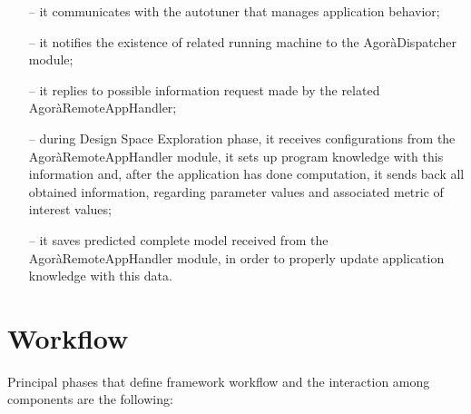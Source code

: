 \begin{enumerate}
\begin{itemize}
		\item [--] it communicates with the autotuner that manages application behavior;

		\item [--] it notifies the existence of related running machine to the AgoràDispatcher module;

		\item [--] it replies to possible information request made by the related AgoràRemoteAppHandler;

		\item [--] during Design Space Exploration phase, it receives configurations from the AgoràRemoteAppHandler module, it sets up program knowledge with this information and, after the application has done computation, it sends back all obtained information, regarding parameter values and associated metric of interest values;

		\item [--] it saves predicted complete model received from the AgoràRemoteAppHandler module, in order to properly update application knowledge with this data.
	\end{itemize}

\end{enumerate}



\section{Workflow}

Principal phases that define framework workflow and the interaction among components are the following:

